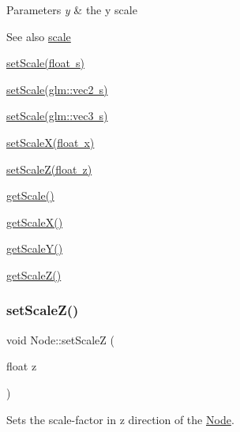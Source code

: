\begin{DoxyParams}{Parameters}
{\em y} & the y scale \\
\hline
\end{DoxyParams}
\begin{DoxySeeAlso}{See also}
\mbox{\hyperlink{classsage_1_1Node_a686c3edeea1faab8b566bfdf2fe3f906}{scale}} 

\mbox{\hyperlink{classsage_1_1Node_a939698b2eb68ee5b60b91e2426e95369}{set\+Scale(float s)}} 

\mbox{\hyperlink{classsage_1_1Node_aecff30b003ce1c2266cc60a34b72559d}{set\+Scale(glm\+::vec2 s)}} 

\mbox{\hyperlink{classsage_1_1Node_a7481b934a6ef259a14aee4d0b87cb2aa}{set\+Scale(glm\+::vec3 s)}} 

\mbox{\hyperlink{classsage_1_1Node_ab8126397f90ccdee0755b984b26809d8}{set\+Scale\+X(float x)}} 

\mbox{\hyperlink{classsage_1_1Node_a5cc4be0b41e5a737cae73fff05e86857}{set\+Scale\+Z(float z)}} 

\mbox{\hyperlink{classsage_1_1Node_ac41e15cac1e23a4c48798291c70dcdd8}{get\+Scale()}} 

\mbox{\hyperlink{classsage_1_1Node_a27040ef8ab59ccf42b87d6ddc8d794e6}{get\+Scale\+X()}} 

\mbox{\hyperlink{classsage_1_1Node_ab87661ab8940512baf2e7639ea55ff87}{get\+Scale\+Y()}} 

\mbox{\hyperlink{classsage_1_1Node_a0b55ddbe04d126953e1db8606d9a9ecd}{get\+Scale\+Z()}} 
\end{DoxySeeAlso}
\mbox{\label{classsage_1_1Node_a5cc4be0b41e5a737cae73fff05e86857}} 
\subsubsection{\texorpdfstring{setScaleZ()}{setScaleZ()}}
{\footnotesize\ttfamily void Node\+::set\+ScaleZ (\begin{DoxyParamCaption}\item[{float}]{z }\end{DoxyParamCaption})}



Sets the scale-\/factor in z direction of the \mbox{\hyperlink{classsage_1_1Node}{Node}}. 


